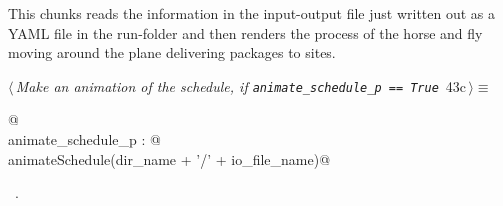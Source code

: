 \documentclass[11.5pt]{report}
\begin{document}
\vspace{-0.8cm} \newchunk This chunks reads the information in the input-output file just written out as
a YAML file in the run-folder and then renders the process of the horse and fly moving around the plane 
delivering packages to sites. 

\begin{flushleft} \small
\begin{minipage}{\linewidth}\label{scrap62}\raggedright\small
{} $\langle\,${\itshape Make an animation of the schedule, if \verb|animate_schedule_p == True|}\nobreak\ {\footnotesize {43c}}$\,\rangle\equiv$
\vspace{-1ex}
\begin{list}{}{} \item
\mbox{}\verb@   @\\
\mbox{}\verb@if animate_schedule_p : @\\
\mbox{}\verb@     animateSchedule(dir_name + '/' + io_file_name)@\\
\mbox{}\verb@@{\NWsep}
\end{list}
\vspace{-1.5ex}
\footnotesize
\begin{list}{}{\setlength{\itemsep}{-\parsep}\setlength{\itemindent}{-\leftmargin}}
\item \NWtxtMacroRefIn\ .

\item{}
\end{list}
\end{minipage}\vspace{4ex}
\end{flushleft}

\vspace{-0.8cm}\newchunk 
\end{document}
